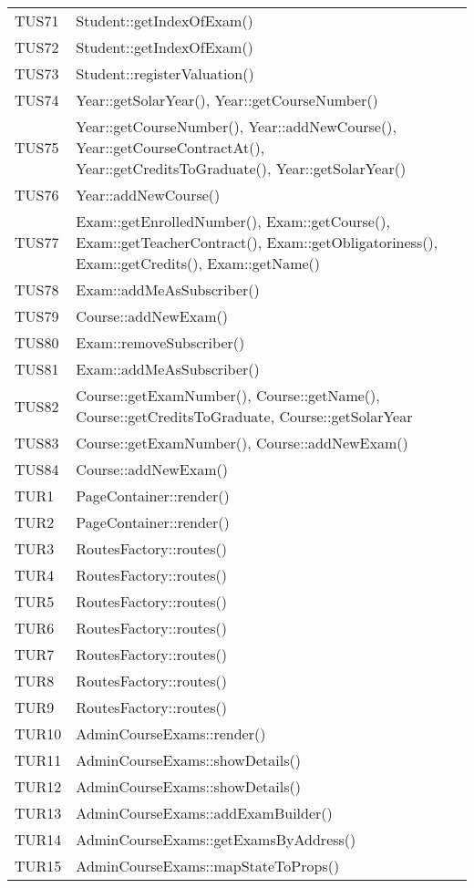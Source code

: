 \documentclass[PianoDiQualifica.tex]{subfiles}
\begin{document}
\begin{longtable}[H]{P{5cm}P{9cm}}
	TUS71 & Student::getIndexOfExam()\\
	TUS72 & Student::getIndexOfExam()\\
	TUS73 & Student::registerValuation()\\
	TUS74 & Year::getSolarYear(), Year::getCourseNumber()\\
	TUS75 & Year::getCourseNumber(), Year::addNewCourse(), Year::getCourseContractAt(), Year::getCreditsToGraduate(), Year::getSolarYear() \\
	TUS76 & Year::addNewCourse()\\
	TUS77 & Exam::getEnrolledNumber(), Exam::getCourse(), Exam::getTeacherContract(), Exam::getObligatoriness(), Exam::getCredits(), Exam::getName()\\
	TUS78 & Exam::addMeAsSubscriber()\\
	TUS79 & Course::addNewExam()\\
	TUS80 & Exam::removeSubscriber()\\
	TUS81 & Exam::addMeAsSubscriber()\\
	TUS82 & Course::getExamNumber(), Course::getName(), Course::getCreditsToGraduate, Course::getSolarYear\\
	TUS83 & Course::getExamNumber(), Course::addNewExam()\\
	TUS84 & Course::addNewExam()\\
	\hhline{==}
	TUR1 & PageContainer::render() \\ 
	TUR2 & PageContainer::render() \\ 
	TUR3 & RoutesFactory::routes() \\ 
	TUR4 & RoutesFactory::routes() \\ 
	TUR5 & RoutesFactory::routes() \\ 
	TUR6 & RoutesFactory::routes() \\ 
	TUR7 & RoutesFactory::routes() \\ 
	TUR8 & RoutesFactory::routes() \\ 
	TUR9 & RoutesFactory::routes() \\ 
	TUR10 & AdminCourseExams::render() \\ 
	TUR11 & AdminCourseExams::showDetails() \\ 
	TUR12 & AdminCourseExams::showDetails() \\ 
	TUR13 & AdminCourseExams::addExamBuilder() \\ 
	TUR14 & AdminCourseExams::getExamsByAddress() \\ 
	TUR15 & AdminCourseExams::mapStateToProps() \\ 

\end{longtable}
\end{document}
